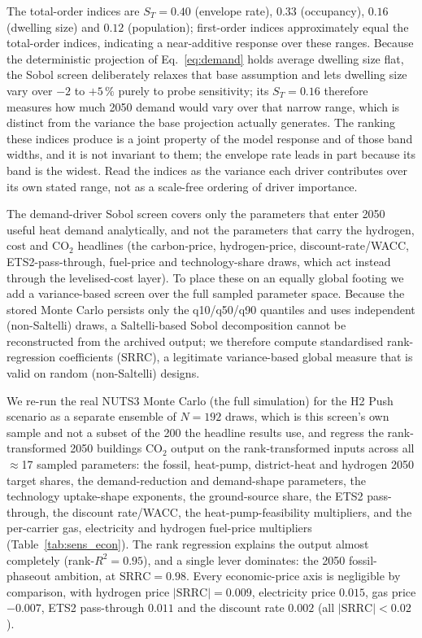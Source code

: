 The total-order indices are $S_T=0.40$ (envelope rate), $0.33$ (occupancy), $0.16$
(dwelling size) and $0.12$ (population); first-order indices approximately equal the
total-order indices, indicating a near-additive response over these ranges. Because the
deterministic projection of Eq.~\eqref{eq:demand} holds average dwelling size flat, the
Sobol screen deliberately relaxes that base assumption and lets dwelling size vary over
$-2$ to $+5\,\%$ purely to probe sensitivity; its $S_T=0.16$ therefore measures how much
2050 demand would vary over that narrow range, which is distinct from the variance
the base projection actually generates. The ranking these indices produce is a joint
property of the model response and of those band widths, and it is not invariant to
them; the envelope rate leads in part because its band is the widest. Read the indices
as the variance each driver contributes over its own stated range, not as a scale-free
ordering of driver importance.

The demand-driver Sobol screen covers only the parameters that enter 2050 useful heat
demand analytically, and not the parameters that carry the hydrogen, cost and
CO$_2$ headlines (the carbon-price, hydrogen-price, discount-rate/WACC,
ETS2-pass-through, fuel-price and technology-share draws, which act instead through the
levelised-cost layer). To place these on an equally global footing we add a
variance-based screen over the full sampled parameter space. Because the stored Monte
Carlo persists only the q10/q50/q90 quantiles and uses independent (non-Saltelli) draws,
a Saltelli-based Sobol decomposition cannot be reconstructed from the archived output;
we therefore compute standardised rank-regression coefficients (SRRC), a legitimate
variance-based global measure that is valid on random (non-Saltelli) designs.

We re-run the real NUTS3 Monte Carlo (the full simulation) for the H2 Push scenario as a
separate ensemble of $N=192$ draws, which is this screen's own sample and not a subset of
the 200 the headline results use, and regress the rank-transformed 2050 buildings CO$_2$ output on the
rank-transformed inputs across all $\approx$17 sampled parameters: the fossil,
heat-pump, district-heat and hydrogen 2050 target shares, the demand-reduction and
demand-shape parameters, the technology uptake-shape exponents, the ground-source share,
the ETS2 pass-through, the discount rate/WACC, the heat-pump-feasibility multipliers,
and the per-carrier gas, electricity and hydrogen fuel-price multipliers
(Table~\ref{tab:sens_econ}). The rank regression explains the output almost completely
(rank-$R^2 = 0.95$), and a single lever dominates: the 2050 fossil-phaseout ambition, at
$\mathrm{SRRC} = 0.98$. Every economic-price axis is negligible by comparison, with
hydrogen price $|\mathrm{SRRC}| = 0.009$, electricity price $0.015$, gas price $-0.007$,
ETS2 pass-through $0.011$ and the discount rate $0.002$ (all $|\mathrm{SRRC}| < 0.02$).

